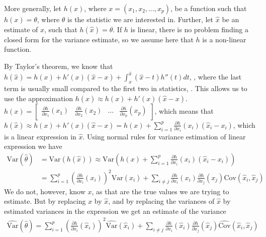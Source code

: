 \documentclass{article}
\begin{document}
More generally, let \(h(x)\), where \(x = (x_1, x_2, \dots, x_p)\), be a function such that \(h(x) = \theta\), where
\(\theta\) is the statistic we are interested in. Further, let \(\hat{x}\) be an
estimate of \(x\), such that \(h(\hat{x}) = \hat{\theta}\). If \(h\) is
linear, there is no problem finding a closed form for the variance estimate,
so we assume here that \(h\) is a non-linear function.

By Taylor's theorem, we know that \(h(\hat{x}) = h(x) + h'(x) (\hat{x} - x) + \int_x^{\hat{x}}  (\hat{x} -
t) h''(t) dt\), \cite{kalkulus}, where the last term is usually small compared to the first two
in statistics, \cite[Chapter 9]{sampReg}. This allows us to use the approximation \(h(\hat{x}) \approx h(x) +
h'(x) (\hat{x} - x)\). \(h(x) = \begin{bmatrix} \frac{\partial h}{\partial x_1}
  (x_1) & \frac{\partial h}{\partial x_2} (x_2) & \dots & \frac{\partial
    h}{\partial x_p} (x_p)\end{bmatrix}\), which means that \(h(\hat{x}) \approx
h(x) + h'(x) (\hat{x} -
x) = h(x) + \sum_{i = 1}^p \frac{\partial h}{\partial x_i} (x_i) \left( \hat{x}_i - x_i
\right)\), which is a linear expression in \(\hat{x}\). Using normal rules for
variance estimation of linear expression we have
\begin{align*}
  \mathrm{Var} \left( \hat{\theta} \right)
  &= \mathrm{Var} \left( h(\hat{x}) \right)
  \approx \mathrm{Var} \left( h(x) + \sum_{i = 1}^p \frac{\partial h}{\partial x_i} (x_i) \left( \hat{x}_i - x_i
    \right) \right) \\
    &= \sum_{i = 1}^p \left( \frac{\partial h}{\partial x_i} (x_i)  \right)^2 \mathrm{Var} \left( \hat{x}_i \right) + \sum_{i \neq j}  \frac{\partial h}{\partial x_i} (x_i)  \frac{\partial h}{\partial x_j} (x_j)  \mathrm{Cov} \left( \hat{x}_i, \hat{x}_j \right)
\end{align*}
We do not, however, know \(x\), as that are the true values we are trying to
estimate. But by replacing \(x\) by \(\hat{x}\), and by replacing the variances
of \(\hat{x}\) by estimated variances in the expression we get an
estimate of the variance
\begin{align*}
  \widehat{\mathrm{Var}} \left( \hat{\theta} \right)
  = \sum_{i = 1}^p \left( \frac{\partial h}{\partial x_i} (\hat{x}_i)  \right)^2 \widehat{\mathrm{Var}} \left( \hat{x}_i \right) + \sum_{i \neq j}  \frac{\partial h}{\partial x_i} (\hat{x}_i)  \frac{\partial h}{\partial x_j} (\hat{x}_j)  \widehat{\mathrm{Cov}} \left( \hat{x}_i, \hat{x}_j \right)
\end{align*}
\end{document}
